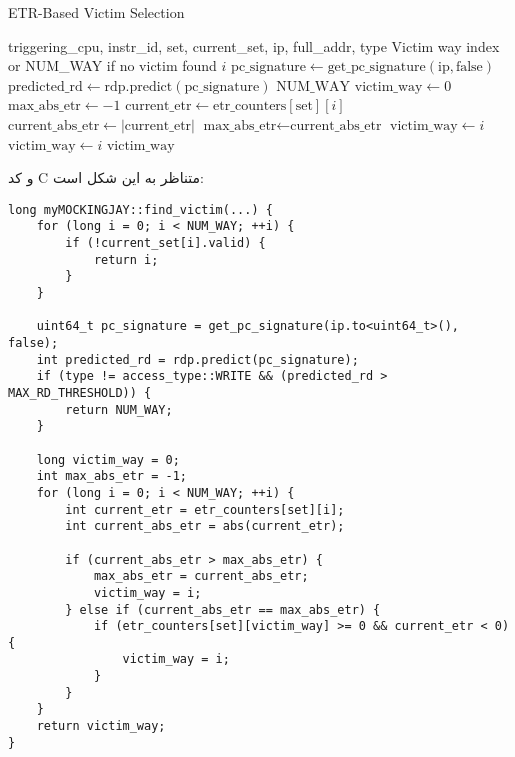 \documentclass[17pt]{article}
\begin{document}
\begin{latin}
\begin{algorithm}
\caption{ETR-Based Victim Selection}\label{alg:etr_victim}
\begin{algorithmic}[1]
\Require triggering\_cpu, instr\_id, set, current\_set, ip, full\_addr, type
\Ensure Victim way index or NUM\_WAY if no victim found
\Statex
{}
            \State \Return $i$ 
        \EndIf
    \EndFor
    \Statex
    \State $\text{pc\_signature} \gets \text{get\_pc\_signature}(\text{ip}, \text{false})$
    \State $\text{predicted\_rd} \gets \text{rdp.predict}(\text{pc\_signature})$
        \State \Return $\text{NUM\_WAY}$ 
    \EndIf
    \Statex
    \State $\text{victim\_way} \gets 0$
    \State $\text{max\_abs\_etr} \gets -1$
        \State $\text{current\_etr} \gets \text{etr\_counters}[\text{set}][i]$
        \State $\text{current\_abs\_etr} \gets |\text{current\_etr}|$
        \Statex
            \State $\text{max\_abs\_etr} \gets \text{current\_abs\_etr}$
            \State $\text{victim\_way} \gets i$
                \State $\text{victim\_way} \gets i$ 
            \EndIf
        \EndIf
    \EndFor
    \State \Return $\text{victim\_way}$
\EndFunction
\end{algorithmic}
\end{algorithm}
\end{latin}
\newpage
و کد C متناظر به این شکل است:
\begin{LTR}
\begin{lstlisting}
long myMOCKINGJAY::find_victim(...) {
    for (long i = 0; i < NUM_WAY; ++i) {
        if (!current_set[i].valid) {
            return i;
        }
    }

    uint64_t pc_signature = get_pc_signature(ip.to<uint64_t>(), false);
    int predicted_rd = rdp.predict(pc_signature);
    if (type != access_type::WRITE && (predicted_rd > MAX_RD_THRESHOLD)) {
        return NUM_WAY;
    }

    long victim_way = 0;
    int max_abs_etr = -1;
    for (long i = 0; i < NUM_WAY; ++i) {
        int current_etr = etr_counters[set][i];
        int current_abs_etr = abs(current_etr);

        if (current_abs_etr > max_abs_etr) {
            max_abs_etr = current_abs_etr;
            victim_way = i;
        } else if (current_abs_etr == max_abs_etr) {
            if (etr_counters[set][victim_way] >= 0 && current_etr < 0) {
                victim_way = i;
            }
        }
    }
    return victim_way;
}
\end{lstlisting}
\end{LTR}
\end{document}
